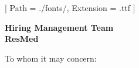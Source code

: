


\renewcommand{\photo}[2]{}

\geometry{
  left=2cm,
  right=2cm,
  top=2cm,
  bottom=2cm
}



\makecvheader

\setmainfont{NotoSans-Regular}[
  Path = ./fonts/,
  Extension = .ttf
]

\vspace{1cm}
\indent\textbf{Hiring Management Team}\\
\indent\textbf{ResMed}

\vspace{0.5cm}

\noindent To whom it may concern:

\vspace{0.5cm}

